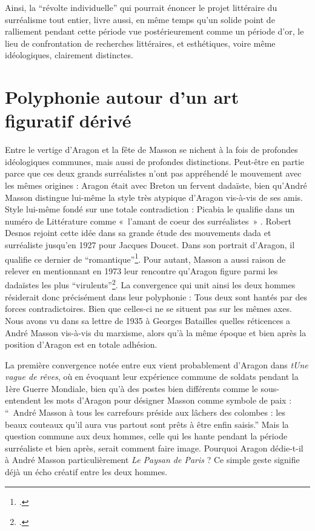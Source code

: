 	Ainsi, la \enquote{révolte individuelle} qui pourrait énoncer le projet littéraire du surréalisme tout entier, livre aussi, en même temps qu’un solide point de ralliement pendant cette période vue postérieurement comme un période d’or, le lieu de confrontation de recherches littéraires, et esthétiques, voire même idéologiques, clairement distinctes. 

	\section{Polyphonie autour d'un art figuratif dérivé}


Entre le vertige d’Aragon et la fête de Masson se nichent à la fois de profondes idéologiques communes, mais aussi de profondes distinctions. Peut-être en partie parce que ces deux grands surréalistes n’ont pas appréhendé le mouvement avec les mêmes origines : Aragon était avec Breton un fervent dadaïste, bien qu’André Masson distingue lui-même la style très atypique d’Aragon vis-à-vis de ses amis. Style lui-même fondé sur une totale contradiction : Picabia le qualifie dans un numéro de Littérature comme « l’amant de coeur des surréalistes » . Robert Desnos rejoint cette idée dans sa grande étude des mouvements dada et surréaliste jusqu’en 1927 pour Jacques Doucet. Dans son portrait d’Aragon, il qualifie ce dernier de \enquote{romantique}\footcite{desnos}. Pour autant, Masson a aussi raison de relever en mentionnant en 1973 leur rencontre qu’Aragon figure parmi les dadaïstes les plus \enquote{virulents}\footcite[p84]{rebelle}. La convergence qui unit ainsi les deux hommes résiderait donc précisément dans leur polyphonie : Tous deux sont hantés par des forces contradictoires. Bien que celles-ci ne se situent pas sur les mêmes axes. Nous avons vu dans sa lettre de 1935 à Georges Batailles quelles réticences a André Masson vis-à-vis du marxisme, alors qu’à la même époque et bien après la position d’Aragon est en totale adhésion. 

La première convergence notée entre eux vient probablement d’Aragon dans \emph{tUne vague de rêves}, où en évoquant leur expérience commune de soldats pendant la 1ère Guerre Mondiale, bien qu’à des postes bien différents comme le sous-entendent les mots d’Aragon pour désigner Masson comme symbole de paix : \enquote{ André Masson à tous les carrefours préside aux lâchers des colombes : les beaux couteaux qu’il aura vus partout sont prêts à être enfin saisis.} Mais la question commune aux deux hommes, celle qui les hante pendant la période surréaliste et bien après, serait comment faire image. Pourquoi Aragon dédie-t-il à André Masson particulièrement \emph{Le Paysan de Paris }? Ce simple geste signifie déjà un écho créatif entre les deux hommes.

